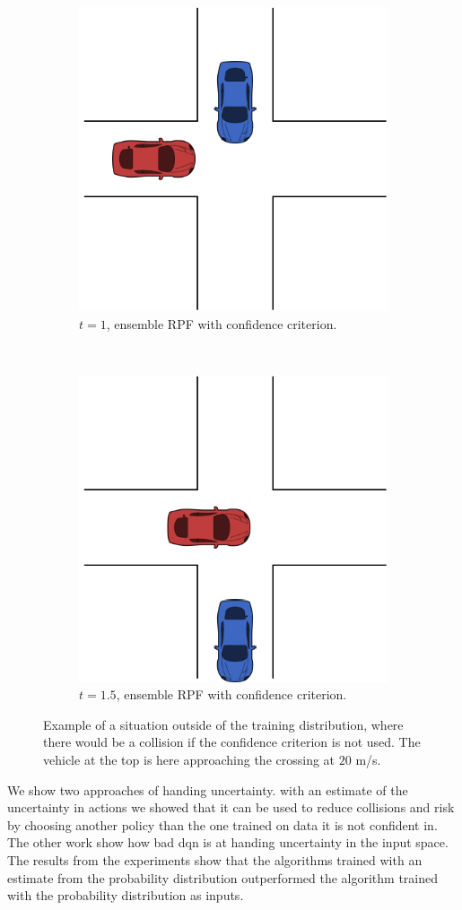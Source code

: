 \begin{figure}[!t]
{{	\begin{subfigure}[t]{0.48\columnwidth}
		\centering
		\includegraphics[width=0.7\columnwidth]{YourThesis/papers/ensamble/figures/figures-scen3.pdf}
		\caption{$t=1$, ensemble RPF with confidence criterion.}
	\end{subfigure}
	~ 
	\begin{subfigure}[t]{0.48\columnwidth}
		\centering
		\includegraphics[width=0.7\columnwidth]{YourThesis/papers/ensamble/figures/figures-scen4.pdf}
		\caption{$t=1.5$, ensemble RPF with confidence criterion.}
	\end{subfigure}
	}}
	\caption{Example of a situation outside of the training distribution,
	where there would be a collision if the confidence criterion is not used. The vehicle at the top is here approaching the crossing at $20$ m/s.}

\end{figure}

We show two approaches of handing uncertainty. with an estimate of the uncertainty in actions we showed that it can be used to reduce collisions and risk by choosing another policy than the one trained on data it is not confident in. 
The other work show how bad \gls{dqn} is at handing uncertainty in the input space. The results from the experiments show that the algorithms trained with an estimate from the probability distribution outperformed the algorithm trained with the probability distribution as inputs. 